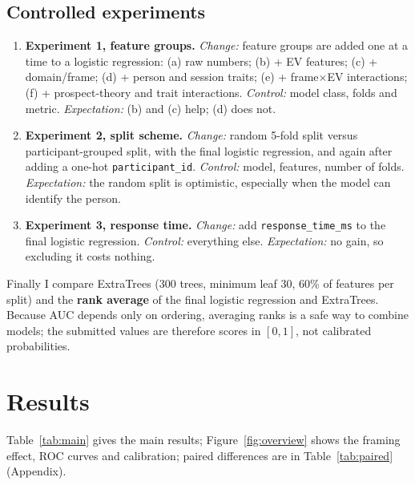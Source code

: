 \documentclass[11pt,a4paper]{article}
\begin{document}
\subsection{Controlled experiments}\label{sec:exps}
\begin{enumerate}
\item \textbf{Experiment 1, feature groups.} \emph{Change:} feature groups are added one at a time to a logistic
  regression: (a) raw numbers; (b) + EV features; (c) + domain/frame; (d) + person and session traits;
  (e) + frame$\times$EV interactions; (f) + prospect-theory and trait interactions. \emph{Control:} model class,
  folds and metric. \emph{Expectation:} (b) and (c) help; (d) does not.
\item \textbf{Experiment 2, split scheme.} \emph{Change:} random 5-fold split versus participant-grouped split,
  with the final logistic regression, and again after adding a one-hot \texttt{participant\_id}.
  \emph{Control:} model, features, number of folds. \emph{Expectation:} the random split is optimistic, especially
  when the model can identify the person.
\item \textbf{Experiment 3, response time.} \emph{Change:} add \texttt{response\_time\_ms} to the final
  logistic regression. \emph{Control:} everything else. \emph{Expectation:} no gain, so excluding it costs nothing.
\end{enumerate}
Finally I compare ExtraTrees (300 trees, minimum leaf 30, 60\% of features per split) and the \textbf{rank
average} of the final logistic regression and ExtraTrees. Because AUC depends only on ordering, averaging ranks is a
safe way to combine models; the submitted values are therefore scores in $[0,1]$, not calibrated probabilities.

\section{Results}
Table~\ref{tab:main} gives the main results; Figure~\ref{fig:overview} shows the framing effect, ROC curves and
calibration; paired differences are in Table~\ref{tab:paired} (Appendix).
\end{document}
